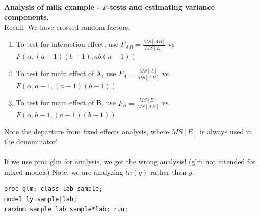 \newpage

\textbf{Analysis of milk example - $F$-tests and estimating variance components.} \\
Recall: We have crossed random factors.  
\begin{enumerate}
\item To test for interaction effect, use $F_{AB}=\frac{MS[AB]}{MS[E]}$ vs $F(\alpha,(a-1)(b-1),ab(n-1))$
\item To test for main effect of A, use $F_{A}=\frac{MS[A]}{MS[AB]}$ vs $F(\alpha,a-1,(a-1)(b-1))$
\item To test for main effect of B, use $F_{B}=\frac{MS[B]}{MS[AB]}$ vs $F(\alpha,b-1,(a-1)(b-1))$
\end{enumerate}
Note the departure from fixed effects analysis, where $MS[E]$ is always used in the denominator!\\~\\

If we use proc glm for analysis, we get the wrong analysis!  (glm not intended for mixed models)  Note: we are analyzing $ln(y)$ rather than $y$.

\begin{small}
\begin{verbatim}
proc glm; class lab sample;
model ly=sample|lab;
random sample lab sample*lab; run;
\end{verbatim}
\end{small}

